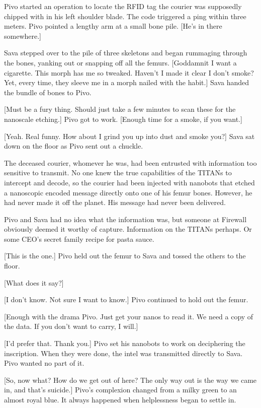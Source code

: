 Pivo started an operation to locate the RFID tag the courier was supposedly chipped with in his left shoulder blade. The code triggered a ping within three meters. Pivo pointed a lengthy arm at a small bone pile. [He's in there somewhere.] 

Sava stepped over to the pile of three skeletons and began rummaging through the bones, yanking out or snapping off all the femurs. [Goddamnit I want a cigarette. This morph has me so tweaked. Haven't I made it clear I don't smoke? Yet, every time, they sleeve me in a morph nailed with the habit.] Sava handed the bundle of bones to Pivo. 

[Must be a fury thing. Should just take a few minutes to scan these for the nanoscale etching.] Pivo got to work. [Enough time for a smoke, if you want.] 

[Yeah. Real funny. How about I grind you up into dust and smoke you?] Sava sat down on the floor as Pivo sent out a chuckle. 

The deceased courier, whomever he was, had been entrusted with information too sensitive to transmit. No one knew the true capabilities of the TITANs to intercept and decode, so the courier had been injected with nanobots that etched a nanoscopic encoded message directly onto one of his femur bones. However, he had never made it off the planet. His message had never been delivered. 

Pivo and Sava had no idea what the information was, but someone at Firewall obviously deemed it worthy of capture. Information on the TITANs perhaps. Or some CEO's secret family recipe for pasta sauce. 

[This is the one.] Pivo held out the femur to Sava and tossed the others to the floor. 

[What does it say?] 

[I don't know. Not sure I want to know.] Pivo continued to hold out the femur. 

[Enough with the drama Pivo. Just get your nanos to read it. We need a copy of the data. If you don't want to carry, I will.] 

[I'd prefer that. Thank you.] Pivo set his nanobots to work on deciphering the inscription. When they were done, the intel was transmitted directly to Sava. Pivo wanted no part of it. 

[So, now what? How do we get out of here? The only way out is the way we came in, and that's suicide.] Pivo's complexion changed from a milky green to an almost royal blue. It always happened when helplessness began to settle in. 

